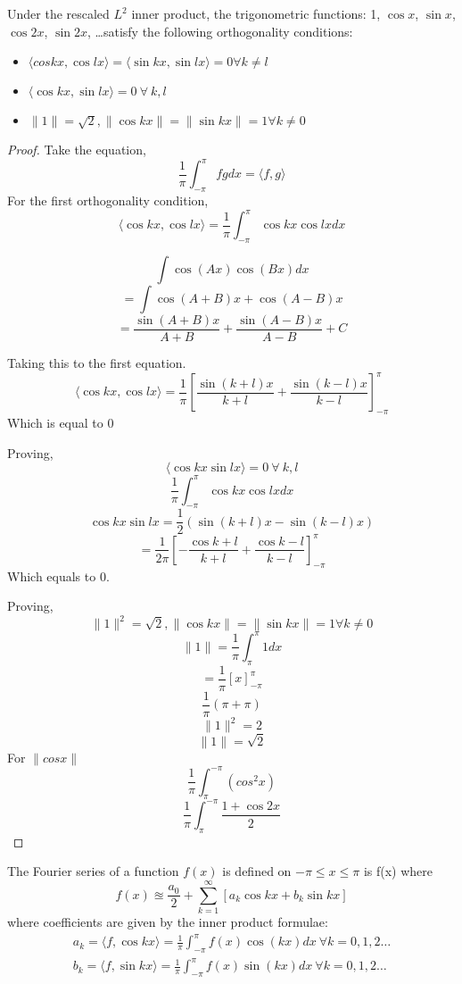 \documentclass[twoside]{report}
\begin{document}
\begin{lemma}
    Under the rescaled $L^2$ inner product, the trigonometric functions: 1, $\cos{x}$, $\sin{x}$, $\cos{2x}$, $\sin{2x}$, \dots satisfy the following orthogonality conditions:
    \begin{itemize}
       \item $\langle cos{kx},\cos{lx}\rangle = \langle \sin{kx}, \sin{lx}\rangle = 0 \forall k \neq l$
        \item $\langle \cos{kx} , \sin{lx}\rangle = 0 \ \forall \ k,l$
        \item $\|1\| = \sqrt{2}, \|\cos{kx}\| = \|\sin{kx}\| = 1 \forall k \neq 0$
    \end{itemize}
\end{lemma}
\begin{proof}
Take the equation,
    \[\frac{1}{\pi} \int_{-\pi}^{\pi} fg dx = \langle f,g \rangle\]
For the first orthogonality condition,
\[\langle\cos{kx},\cos{lx}\rangle = \frac{1}{\pi} \int_{-\pi}^{\pi} \cos{kx}\cos{lx} dx \]

\[\int \cos(Ax)\cos(Bx) dx\]
\[= \int \cos{(A+B)x} + \cos{(A-B)x}\]
\[ = \frac{\sin{(A+B)x}}{A+B} + \frac{\sin{(A-B)x}}{A-B}+C\]

Taking this to the first equation.
\[\langle\cos{kx}, \cos{lx}\rangle = \frac{1}{\pi} [\frac{\sin{(k+l)x}}{k+l} + \frac{\sin{(k-l)x}}{k-l}]^{\pi}_{-\pi}\]
Which is equal to 0

Proving,
\begin{equation}
   \langle \cos{kx} \sin{lx} \rangle = 0 \ \forall \ k, l
\end{equation}
\[
   \frac{1}{\pi} \int_{-\pi}^{\pi} \cos{kx}\cos{lx} dx
\]
\[
   \cos{kx}\sin{lx} =\frac{1}{2}(\sin{(k+l)x} - \sin{(k-l)x})
\]
\[
   = \frac{1}{2\pi} [-\frac{\cos{k+l}}{k+l} + \frac{\cos{k-l}}{k-l}]_{-\pi}^{\pi}
\]
Which equals to 0.

Proving, 
\[
	\|1\|^2 = \sqrt{2}, \|\cos{kx}\| = \|\sin{kx}\| = 1 \forall k \neq 0
\]
\[
   \|1\| = \frac{1}{\pi}\int_{\pi}^{\pi} 1 dx 
\]
\[
   = \frac{1}{\pi}[x]^{\pi}_{-\pi}	
\]
\[
   \frac{1}{\pi} (\pi + \pi)
\]
\[
	\|1\|^2 = 2
\]
\[
   \|1\| = \sqrt{2}
\]
For $\|cos x\|$
\[
   \frac{1}{\pi}\int_\pi^{-\pi} (cos^2 x)
\]
\[
   \frac{1}{\pi} \int_{\pi}^{-\pi} \frac{1+\cos{2x}}{2}
\]
\end{proof}
\begin{definition}
   The Fourier series of a function $f(x)$ is defined on $-\pi \leq x \leq \pi$ is f(x) where    \[
   	 f(x) \approxeq \frac{a_0}{2}+\sum_{k=1}^{\infty}[a_k \cos{kx} + b_k \sin{kx}]
   \]
   where  coefficients are given by the inner product formulae:
   \begin{align*}
      a_k = \langle f, \cos{kx} \rangle = \frac{1}{\pi}\int_{-\pi}^{\pi} f(x) \cos{(kx)} dx \ \forall k = 0,1,2\dots \\
      b_k = \langle f, \sin{kx} \rangle = \frac{1}{\pi}\int_{-\pi}^{\pi} f(x) \sin{(kx)} dx \ \forall k = 0,1,2\dots
   \end{align*}
\end{definition}
\end{document}
